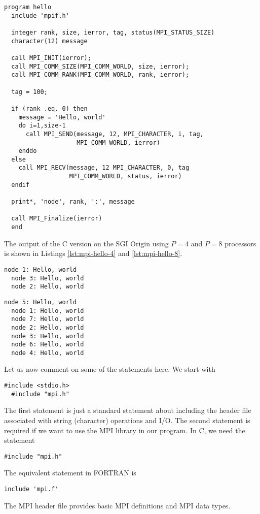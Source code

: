 \begin{lstlisting}[style=fortran, float, caption={Hello world MPI in FORTRAN.}, label=lst:mpi-hello-fortran]
  program hello
  include 'mpif.h'

  integer rank, size, ierror, tag, status(MPI_STATUS_SIZE)
  character(12) message

  call MPI_INIT(ierror);
  call MPI_COMM_SIZE(MPI_COMM_WORLD, size, ierror);
  call MPI_COMM_RANK(MPI_COMM_WORLD, rank, ierror);

  tag = 100;

  if (rank .eq. 0) then
    message = 'Hello, world'
    do i=1,size-1
      call MPI_SEND(message, 12, MPI_CHARACTER, i, tag,
                    MPI_COMM_WORLD, ierror)
    enddo
  else
    call MPI_RECV(message, 12 MPI_CHARACTER, 0, tag
                  MPI_COMM_WORLD, status, ierror)
  endif

  print*, 'node', rank, ':', message

  call MPI_Finalize(ierror)
  end
\end{lstlisting}

The output of the C version on the SGI Origin using $P=4$ and $P=8$ processors
is shown in Listings \ref{lst:mpi-hello-4} and \ref{lst:mpi-hello-8}.

\begin{lstlisting}[float, caption={Hello world MPI in C: $4$ processors.}, label=lst:mpi-hello-4]
  node 1: Hello, world
  node 3: Hello, world
  node 2: Hello, world
\end{lstlisting}

\begin{lstlisting}[float, caption={Hello world MPI in C: $8$ processors.}, label=lst:mpi-hello-8]
  node 5: Hello, world
  node 1: Hello, world
  node 7: Hello, world
  node 2: Hello, world
  node 3: Hello, world
  node 6: Hello, world
  node 4: Hello, world
\end{lstlisting}

Let us now comment on some of the statements here. We start with
\begin{lstlisting}[style=c]
  #include <stdio.h>
  #include "mpi.h"
\end{lstlisting}
The first statement is just a standard statement about including the header file
associated with string (character) operations and I/O. The second statement is
required if we want to use the MPI library in our program. In C, we need the
statement
\begin{lstlisting}[style=c]
  #include "mpi.h"
\end{lstlisting}
The equivalent statement in FORTRAN is
\begin{lstlisting}[style=fortran]
  include 'mpi.f'
\end{lstlisting}
The MPI header file provides basic MPI definitions and MPI data types.

